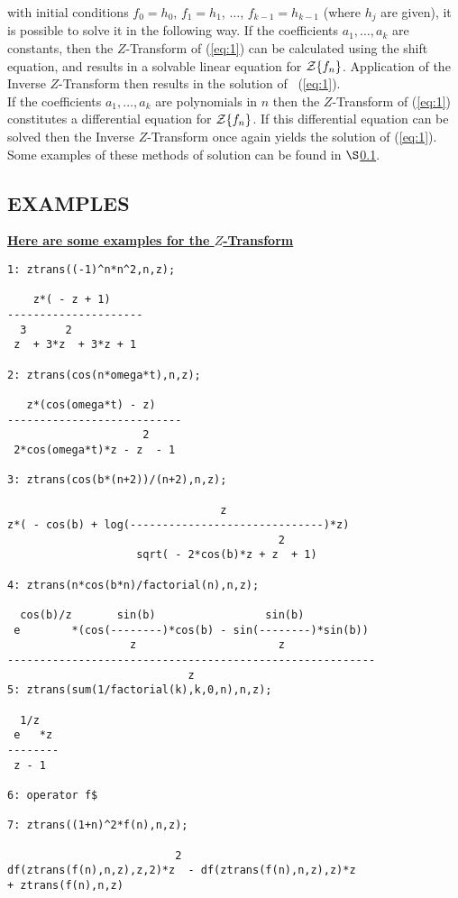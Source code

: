   with initial conditions
  $f_0 = h_0$, $f_1 = h_1$, $\ldots$, $f_{k-1} = h_{k-1}$ (where $h_j$
  are given), it is possible to solve it in the following way.
   If the coefficients $a_1, \ldots , a_k$ are constants, then the 
  $Z$-Transform of (\ref{eq:1}) can be calculated using the shift
  equation, and results in a solvable linear equation for 
  ${\cal Z} \{f_n\}$. Application of the Inverse $Z$-Transform
  then results in the solution of \ (\ref{eq:1}).\\
  If the coefficients $a_1, \ldots , a_k$ are polynomials in $n$ then
  the $Z$-Transform of (\ref{eq:1}) constitutes a differential
  equation for ${\cal Z} \{f_n\}$. If this differential equation can
  be solved then the Inverse $Z$-Transform once again yields the
  solution of (\ref{eq:1}).
  Some examples of these methods of solution can be found in
  $\S$\ref{ztranssec:Examples}.

\subsection{EXAMPLES}
\label{ztranssec:Examples}
\underline {{\bf Here are some examples for the $Z$-Transform}}\\
\begin{verbatim}
1: ztrans((-1)^n*n^2,n,z);

    z*( - z + 1)
---------------------
  3      2
 z  + 3*z  + 3*z + 1

2: ztrans(cos(n*omega*t),n,z);

   z*(cos(omega*t) - z)
---------------------------
                     2
 2*cos(omega*t)*z - z  - 1

3: ztrans(cos(b*(n+2))/(n+2),n,z);

                                 z
z*( - cos(b) + log(------------------------------)*z)
                                          2
                    sqrt( - 2*cos(b)*z + z  + 1)

4: ztrans(n*cos(b*n)/factorial(n),n,z);

  cos(b)/z       sin(b)                 sin(b)
 e        *(cos(--------)*cos(b) - sin(--------)*sin(b))
                   z                      z
---------------------------------------------------------
                            z
5: ztrans(sum(1/factorial(k),k,0,n),n,z);

  1/z
 e   *z
--------
 z - 1

6: operator f$

7: ztrans((1+n)^2*f(n),n,z);

                          2
df(ztrans(f(n),n,z),z,2)*z  - df(ztrans(f(n),n,z),z)*z 
+ ztrans(f(n),n,z)

\end{verbatim}

